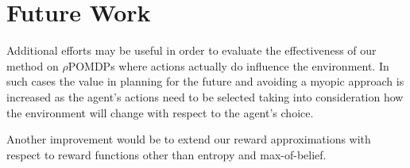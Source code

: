 \section{Future Work}

Additional efforts may be useful in order to evaluate the effectiveness of our method on
$\rho$POMDPs where actions actually do influence the environment. In such cases the value in
planning for the future and avoiding a myopic approach is increased as the agent's actions need to
be selected taking into consideration how the environment will change with respect to the agent's
choice.

Another improvement would be to extend our reward approximations with respect to reward functions
other than entropy and max-of-belief.
